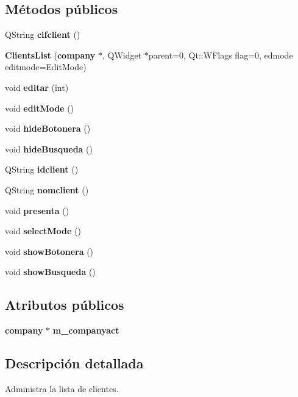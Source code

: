 \subsection*{M\'{e}todos p\'{u}blicos}
\begin{CompactItemize}
\item 
QString {\bf cifclient} ()\label{classClientsList_a0}

\item 
{\bf Clients\-List} ({\bf company} $\ast$, QWidget $\ast$parent=0, Qt::WFlags flag=0, edmode editmode=Edit\-Mode)
\item 
void {\bf editar} (int)\label{classClientsList_a2}

\item 
void {\bf edit\-Mode} ()\label{classClientsList_a3}

\item 
void {\bf hide\-Botonera} ()\label{classClientsList_a4}

\item 
void {\bf hide\-Busqueda} ()\label{classClientsList_a5}

\item 
QString {\bf idclient} ()\label{classClientsList_a6}

\item 
QString {\bf nomclient} ()\label{classClientsList_a7}

\item 
void {\bf presenta} ()
\item 
void {\bf select\-Mode} ()\label{classClientsList_a9}

\item 
void {\bf show\-Botonera} ()\label{classClientsList_a10}

\item 
void {\bf show\-Busqueda} ()\label{classClientsList_a11}

\end{CompactItemize}
\subsection*{Atributos p\'{u}blicos}
\begin{CompactItemize}
\item 
{\bf company} $\ast$ {\bf m\_\-companyact}\label{classClientsList_o0}

\end{CompactItemize}


\subsection{Descripci\'{o}n detallada}
Administra la lista de clientes. 



